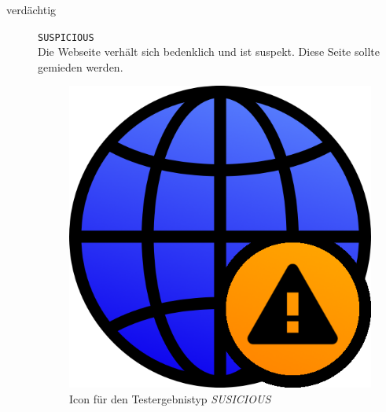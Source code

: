\begin{description}
	\item[verdächtig] \hfill \texttt{SUSPICIOUS} \\
	Die Webseite verhält sich bedenklich und ist suspekt.
	Diese Seite sollte gemieden werden.
    \begin{figure}[H]
    	\centering
    	\includegraphics[scale=0.2]{images/webifier-suspicious}
    	\caption{Icon für den Testergebnistyp \textit{SUSICIOUS}}
    \end{figure}


\end{description}
